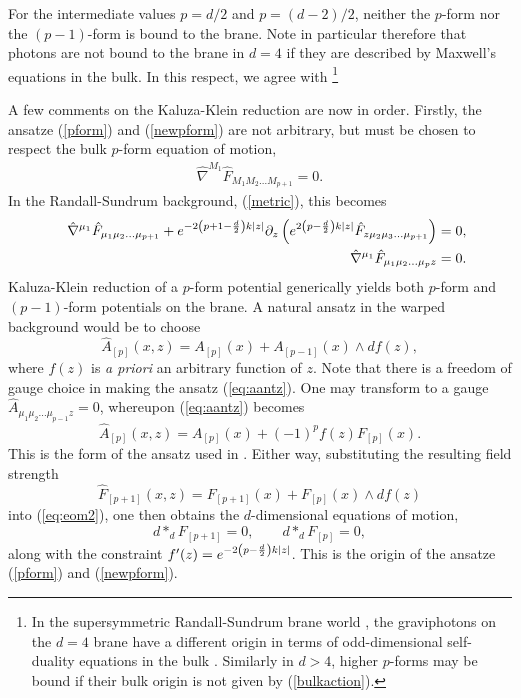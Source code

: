 \documentclass[a4paper,12pt]{article}
\def\fft#1#2{{#1\over#2}}
\begin{document}
For the intermediate values $p=d/2$ and $p=(d-2)/2$, neither the
$p$-form nor the $(p-1)$-form is bound to the brane. Note in particular
therefore that photons are not bound to the brane in $d=4$ if they
are described by Maxwell's equations in the bulk. In this respect, we
agree with \cite{Bajc:2000mh,kaloper}%
%
\footnote{In the supersymmetric Randall-Sundrum brane world
\cite{Bremer,Duffliu,DLS}, the graviphotons on the $d=4$ brane have a
different origin in terms of odd-dimensional self-duality equations
in the bulk \cite{lupope,Duffliu2,Cvetic:2000gj}. Similarly in $d>4$, higher
$p$-forms may be bound if their bulk origin is not given by
(\ref{bulkaction}).}
%

A few comments on the Kaluza-Klein reduction are now in order.  Firstly, the
ansatze (\ref{pform}) and (\ref{newpform}) are not arbitrary, but must be
chosen to respect the bulk $p$-form equation of motion,
%
\begin{eqnarray}
\label{eq:eom1}
\hat \nabla^{M_1}\hat F_{M_1M_2\ldots M_{p+1}}=0.
\end{eqnarray}
%
In the Randall-Sundrum background, (\ref{metric}), this becomes
%
\begin{eqnarray}
\label{eq:eom2}
&&\hat \nabla^{\mu_1}\hat F_{\mu_1\mu_2\ldots\mu_{p+1}}
+e^{-2\left(p+1-\fft{d}2\right)k|z|}\partial_z
\left(e^{2\left(p-\fft{d}2\right)k|z|}
\hat F_{z\mu_2\mu_3\ldots\mu_{p+1}}\right)=0,\nonumber\\
&&\hat \nabla^{\mu_1}\hat F_{\mu_1\mu_2\ldots\mu_pz}=0.
\end{eqnarray}
%
Kaluza-Klein reduction of a $p$-form potential generically yields both
$p$-form and $(p-1)$-form potentials on the brane.  A natural ansatz in the
warped background would be to choose
%
\begin{equation}
\label{eq:aantz}
\hat A_{[p]}(x,z)= A_{[p]}(x) + A_{[p-1]}(x) \wedge df(z),
\end{equation}
%
where $f(z)$ is {\it a priori} an arbitrary function of $z$.  Note
that there is a freedom of gauge choice in making the ansatz
(\ref{eq:aantz}).  One may transform to a gauge
$\hat A_{\mu_1\mu_2\ldots\mu_{p-1}z}=0$, whereupon (\ref{eq:aantz}) becomes
%
\begin{equation}
\hat A_{[p]}(x,z)=A_{[p]}(x)+(-1)^pf(z)F_{[p]}(x).
\end{equation}
%
This is the form of the ansatz used in \cite{lupope,Cvetic:2000gj}.
Either way, substituting
the resulting field strength
%
\begin{equation}
\hat F_{[p+1]}(x,z)=F_{[p+1]}(x)+F_{[p]}(x)\wedge df(z)
\end{equation}
%
into (\ref{eq:eom2}), one then obtains the $d$-dimensional equations of
motion,
%
\begin{equation}
d*_dF_{[p+1]}=0,\qquad d*_dF_{[p]}=0,
\end{equation}
%
along with the constraint $f'(z)=e^{-2\left(p-\fft{d}2\right)k|z|}$.  This is
the origin of the ansatze (\ref{pform}) and (\ref{newpform}).
\end{document}
